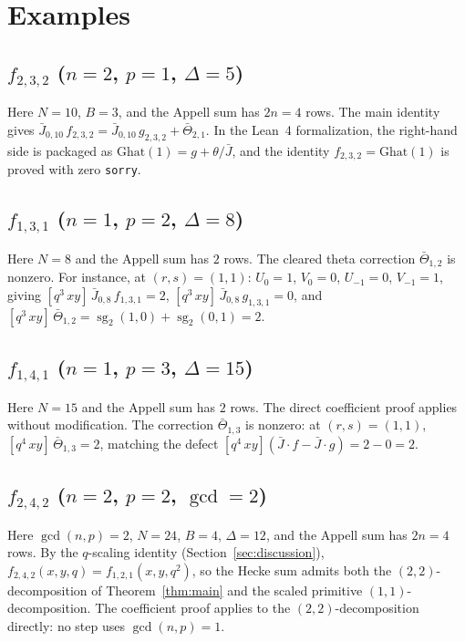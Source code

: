 \documentclass[11pt]{article}
\newcommand{\sgtwo}{\operatorname{sg}_2}
\begin{document}
\section{Examples}\label{sec:examples}

\subsection{\texorpdfstring{$f_{2,3,2}$ ($n=2$, $p=1$, $\Delta=5$)}{f232 (n=2, p=1)}}
Here $N=10$, $B=3$, and the Appell sum has $2n=4$ rows.
The main identity gives
$\bar{J}_{0,10}\,f_{2,3,2}=\bar{J}_{0,10}\,g_{2,3,2}+\bar\Theta_{2,1}$.
In the Lean~4 formalization, the right-hand side is packaged as
$\text{Ghat}(1)=g+\theta/\bar{J}$, and the identity
$f_{2,3,2}=\text{Ghat}(1)$ is proved with zero \texttt{sorry}.

\subsection{\texorpdfstring{$f_{1,3,1}$ ($n=1$, $p=2$, $\Delta=8$)}{f131 (n=1, p=2)}}
Here $N=8$ and the Appell sum has $2$ rows.  The cleared theta
correction $\bar\Theta_{1,2}$ is nonzero.  For instance, at
$(r,s)=(1,1)$: $U_0=1$, $V_0=0$, $U_{-1}=0$, $V_{-1}=1$, giving
$[q^3\,xy]\,\bar{J}_{0,8}\,f_{1,3,1}=2$,
$[q^3\,xy]\,\bar{J}_{0,8}\,g_{1,3,1}=0$, and
$[q^3\,xy]\,\bar\Theta_{1,2}=\sgtwo(1,0)+\sgtwo(0,1)=2$.

\subsection{\texorpdfstring{$f_{1,4,1}$ ($n=1$, $p=3$, $\Delta=15$)}{f141 (n=1, p=3)}}
Here $N=15$ and the Appell sum has $2$ rows.
The direct coefficient proof applies without
modification.  The correction $\bar\Theta_{1,3}$ is nonzero:
at $(r,s)=(1,1)$, $[q^4\,xy]\,\bar\Theta_{1,3}=2$, matching the
defect $[q^4\,xy](\bar{J}\cdot f-\bar{J}\cdot g)=2-0=2$.

\subsection{\texorpdfstring{$f_{2,4,2}$ ($n=2$, $p=2$, $\gcd=2$)}{f242 (n=2, p=2, non-coprime)}}
Here $\gcd(n,p)=2$, $N=24$, $B=4$, $\Delta=12$, and the
Appell sum has $2n=4$ rows.  By the $q$-scaling identity
(Section~\ref{sec:discussion}),
$f_{2,4,2}(x,y,q)=f_{1,2,1}(x,y,q^2)$, so the Hecke sum
admits both the $(2,2)$-decomposition of
Theorem~\ref{thm:main} and the scaled primitive
$(1,1)$-decomposition.  The coefficient proof applies to
the $(2,2)$-decomposition directly: no step uses
$\gcd(n,p)=1$.
\end{document}
